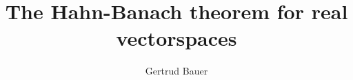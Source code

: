 \documentclass[11pt,a4paper]{article}
\begin{document}
\title{The Hahn-Banach theorem for real vectorspaces}
\author{Gertrud Bauer}
\maketitle


\end{document}
